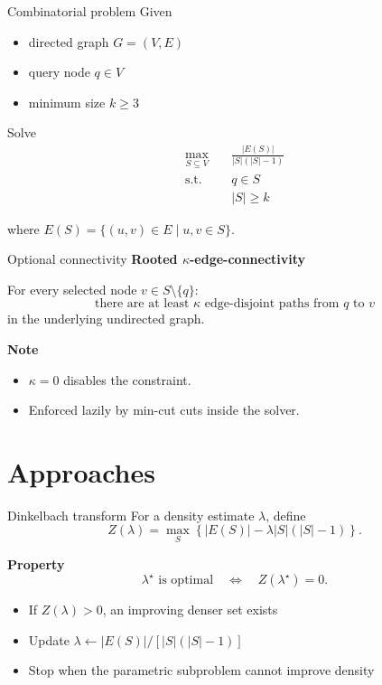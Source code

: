 \documentclass{beamer}
\begin{document}
\begin{frame}{Combinatorial problem}
  Given
  \begin{itemize}
    \item directed graph $G=(V,E)$
    \item query node $q \in V$
    \item minimum size $k \ge 3$
  \end{itemize}

  \vfill

  Solve
  \begin{align*}
    \max_{S \subseteq V} \quad &
    \frac{|E(S)|}{|S|(|S|-1)}              \\
    \mathrm{s.t.} \quad        &
    q \in S                                \\
                               & |S| \ge k
  \end{align*}

  \vfill

  where $E(S)=\{(u,v)\in E \mid u,v\in S\}$.
\end{frame}

\begin{frame}{Optional connectivity}
  \textbf{Rooted $\kappa$-edge-connectivity}

  \vfill

  For every selected node $v \in S \setminus \{q\}$:
  \[
    \text{there are at least } \kappa
    \text{ edge-disjoint paths from } q \text{ to } v
  \]
  in the underlying undirected graph.

  \vfill

  \textbf{Note}
  \begin{itemize}
    \item $\kappa = 0$ disables the constraint.
    \item Enforced lazily by min-cut cuts inside the solver.
  \end{itemize}
\end{frame}

\section{Approaches}

\begin{frame}{Dinkelbach transform}
  For a density estimate $\lambda$, define
  \[
    Z(\lambda)
    =
    \max_S
    \left\{
    |E(S)| - \lambda |S|(|S|-1)
    \right\}.
  \]

  \vfill

  \textbf{Property}
  \[
    \lambda^\star \text{ is optimal}
    \quad \Longleftrightarrow \quad
    Z(\lambda^\star)=0.
  \]

  \vfill

  \begin{itemize}
    \item If $Z(\lambda)>0$, an improving denser set exists
    \item Update $\lambda \gets |E(S)|/[|S|(|S|-1)]$
    \item Stop when the parametric subproblem cannot improve density
  \end{itemize}
\end{frame}
\end{document}
